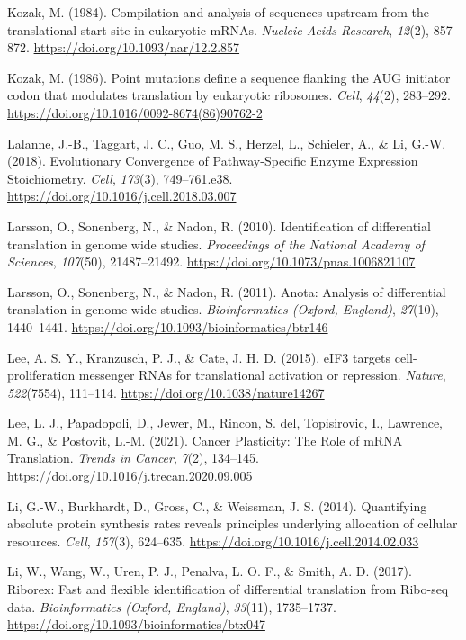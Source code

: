 \documentclass[12pt,openany]{book}
\begin{document}
\hypertarget{ref-Kozak1984}{}
Kozak, M. (1984). Compilation and analysis of sequences upstream from
the translational start site in eukaryotic mRNAs. \emph{Nucleic Acids
Research}, \emph{12}(2), 857--872.
\url{https://doi.org/10.1093/nar/12.2.857}

\hypertarget{ref-Kozak1986}{}
Kozak, M. (1986). Point mutations define a sequence flanking the AUG
initiator codon that modulates translation by eukaryotic ribosomes.
\emph{Cell}, \emph{44}(2), 283--292.
\url{https://doi.org/10.1016/0092-8674(86)90762-2}

\hypertarget{ref-Lalanne2018}{}
Lalanne, J.-B., Taggart, J. C., Guo, M. S., Herzel, L., Schieler, A., \&
Li, G.-W. (2018). Evolutionary Convergence of Pathway-Specific Enzyme
Expression Stoichiometry. \emph{Cell}, \emph{173}(3), 749--761.e38.
\url{https://doi.org/10.1016/j.cell.2018.03.007}

\hypertarget{ref-Larsson2010}{}
Larsson, O., Sonenberg, N., \& Nadon, R. (2010). Identification of
differential translation in genome wide studies. \emph{Proceedings of
the National Academy of Sciences}, \emph{107}(50), 21487--21492.
\url{https://doi.org/10.1073/pnas.1006821107}

\hypertarget{ref-Larsson2011}{}
Larsson, O., Sonenberg, N., \& Nadon, R. (2011). Anota: Analysis of
differential translation in genome-wide studies. \emph{Bioinformatics
(Oxford, England)}, \emph{27}(10), 1440--1441.
\url{https://doi.org/10.1093/bioinformatics/btr146}

\hypertarget{ref-Lee2015}{}
Lee, A. S. Y., Kranzusch, P. J., \& Cate, J. H. D. (2015). eIF3 targets
cell-proliferation messenger RNAs for translational activation or
repression. \emph{Nature}, \emph{522}(7554), 111--114.
\url{https://doi.org/10.1038/nature14267}

\hypertarget{ref-Lee2021}{}
Lee, L. J., Papadopoli, D., Jewer, M., Rincon, S. del, Topisirovic, I.,
Lawrence, M. G., \& Postovit, L.-M. (2021). Cancer Plasticity: The Role
of mRNA Translation. \emph{Trends in Cancer}, \emph{7}(2), 134--145.
\url{https://doi.org/10.1016/j.trecan.2020.09.005}

\hypertarget{ref-Li2014}{}
Li, G.-W., Burkhardt, D., Gross, C., \& Weissman, J. S. (2014).
Quantifying absolute protein synthesis rates reveals principles
underlying allocation of cellular resources. \emph{Cell}, \emph{157}(3),
624--635. \url{https://doi.org/10.1016/j.cell.2014.02.033}

\hypertarget{ref-Li2017}{}
Li, W., Wang, W., Uren, P. J., Penalva, L. O. F., \& Smith, A. D.
(2017). Riborex: Fast and flexible identification of differential
translation from Ribo-seq data. \emph{Bioinformatics (Oxford, England)},
\emph{33}(11), 1735--1737.
\url{https://doi.org/10.1093/bioinformatics/btx047}
\end{document}
